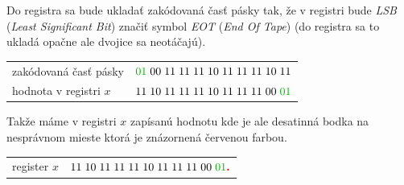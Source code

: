 \documentclass[11pt,a4paper]{article}
\newcommand{\red}[1]{\textcolor{red}{#1}}
\newcommand{\green}[1]{\textcolor{OliveGreen}{#1}}
\begin{document}
Do registra sa bude ukladať zakódovaná časť pásky tak, že v registri bude \textit{LSB} (\textit{Least Significant Bit}) značiť symbol \green{\textit{EOT}} (\textit{End Of Tape}) (do registra sa to ukladá opačne ale dvojice sa neotáčajú).

\begin{center}
    \begin{tabular}{l|l}
        zakódovaná časť pásky  & $\green{01} \hspace{1mm} 00 \hspace{1mm} 11 \hspace{1mm} 11 \hspace{1mm} 11 \hspace{1mm} 10 \hspace{1mm} 11 \hspace{1mm} 11 \hspace{1mm} 11 \hspace{1mm} 10 \hspace{1mm} 11$\\
        hodnota v registri $x$ & $11 \hspace{1mm} 10 \hspace{1mm} 11 \hspace{1mm} 11 \hspace{1mm} 11 \hspace{1mm} 10 \hspace{1mm} 11 \hspace{1mm} 11 \hspace{1mm} 11 \hspace{1mm} 00 \hspace{1mm} \green{01}$
    \end{tabular}
\end{center}

Takže máme v registri $x$ zapísanú hodnotu kde je ale desatinná bodka na nesprávnom mieste ktorá je znázornená červenou farbou.

\begin{center}
    \begin{tabular}{r | l}
        register $x$ & $11 \hspace{1mm} 10 \hspace{1mm} 11 \hspace{1mm} 11 \hspace{1mm} 11 \hspace{1mm} 10 \hspace{1mm} 11 \hspace{1mm} 11 \hspace{1mm} 11 \hspace{1mm} 00 \hspace{1mm} \green{01} \red{\textbf{.}}$
    \end{tabular}
\end{center}
\end{document}

